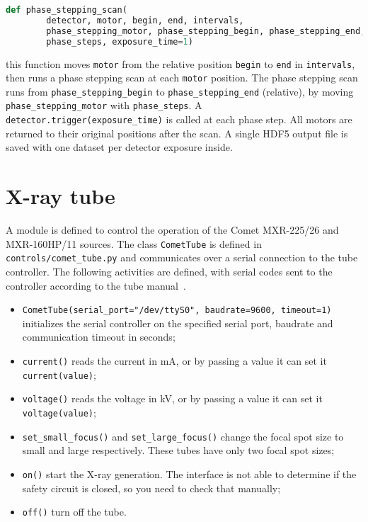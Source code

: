 \begin{lstlisting}[language=Python]
def phase_stepping_scan(
        detector, motor, begin, end, intervals,
        phase_stepping_motor, phase_stepping_begin, phase_stepping_end,
        phase_steps, exposure_time=1)
\end{lstlisting}
this function moves \texttt{motor} from the relative position \texttt{begin}
to \texttt{end} in \texttt{intervals}, then runs a phase stepping scan at
each \texttt{motor} position. The phase stepping scan runs from
\texttt{phase\_stepping\_begin} to
\texttt{phase\_stepping\_end} (relative), by moving
\texttt{phase\_stepping\_motor} with 
\texttt{phase\_steps}. A \texttt{detector.trigger(exposure\_time)} is called
at each phase step.
All motors are returned to their original positions after the scan.
A single HDF5 output file is saved with one dataset per detector exposure
inside.

\section{X-ray tube}
A module is defined to control the operation of the Comet MXR-225/26 and
MXR-160HP/11 sources. The class \texttt{CometTube} is defined in
\texttt{controls/comet\_tube.py} and communicates over a serial connection
to the tube controller.
The following activities are defined, with serial codes sent to the
controller according to the tube manual~\parencite{xray-tube-manual}.

\begin{itemize}
    \item \verb|CometTube(serial_port="/dev/ttyS0", baudrate=9600, timeout=1)|
        initializes the serial controller on the specified
        serial port, baudrate and communication timeout in seconds;
    \item \verb|current()| reads the current in \si{\milli\ampere}, or
        by passing a value it can set it \verb|current(value)|;
    \item \verb|voltage()| reads the voltage in \si{\kilo\volt}, or
        by passing a value it can set it \verb|voltage(value)|;
    \item \verb|set_small_focus()| and \verb|set_large_focus()| change the
        focal spot size to small and large respectively. These tubes have
        only two focal spot sizes;
    \item \verb|on()| start the X-ray generation. The interface is not able
        to determine if the safety circuit is closed, so you need to check
        that manually;
    \item \verb|off()| turn off the tube.
\end{itemize}
